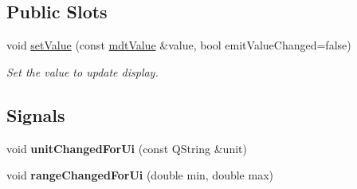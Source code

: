 \subsection*{Public Slots}
\begin{DoxyCompactItemize}
\item 
void \hyperlink{classmdt_analog_io_aa2c2fb87d67aad7bbba1b488cc8c1df2}{setValue} (const \hyperlink{classmdt_value}{mdtValue} \&value, bool emitValueChanged=false)
\begin{DoxyCompactList}\small\item\em Set the value to update display. \end{DoxyCompactList}\end{DoxyCompactItemize}
\subsection*{Signals}
\begin{DoxyCompactItemize}
\item 
\hypertarget{classmdt_analog_io_aa81b49605f601850ecfa780f2b758e98}{
void {\bfseries unitChangedForUi} (const QString \&unit)}
\label{classmdt_analog_io_aa81b49605f601850ecfa780f2b758e98}

\item 
\hypertarget{classmdt_analog_io_a40735cbbf852790067a6f9b57aac4aa3}{
void {\bfseries rangeChangedForUi} (double min, double max)}
\label{classmdt_analog_io_a40735cbbf852790067a6f9b57aac4aa3}

\end{DoxyCompactItemize}
